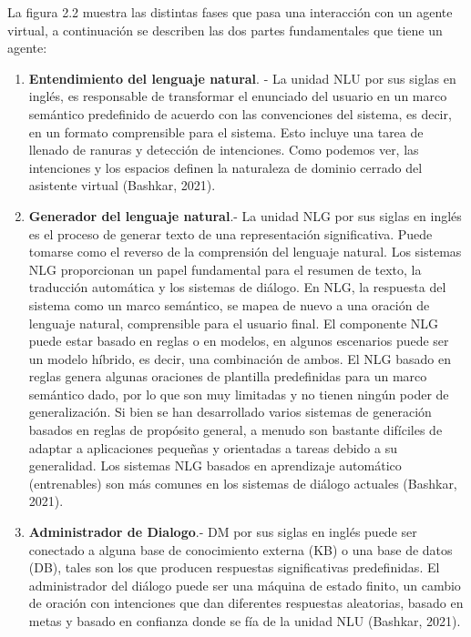 \documentclass[letter, openright, 12pt]{book}
\begin{document}
La figura 2.2 muestra las distintas fases que pasa una interacción con un agente virtual, a continuación se describen las dos partes fundamentales que tiene un agente: 

\newpage
\begin{enumerate}[label=(\alph*)]
\item \textbf{Entendimiento del lenguaje natural}. - La unidad NLU por sus siglas en inglés, es responsable de transformar el enunciado del usuario en un marco semántico predefinido de acuerdo con las convenciones del sistema, es decir, en un formato comprensible para el sistema. Esto incluye una tarea de llenado de ranuras y detección de intenciones. Como podemos ver, las intenciones y los espacios definen la naturaleza de dominio cerrado del asistente virtual (Bashkar, 2021).

\item \textbf{Generador del lenguaje natural}.- La unidad NLG por sus siglas en inglés es el proceso de generar texto de una representación significativa. Puede tomarse como el reverso de la comprensión del lenguaje natural. Los sistemas NLG proporcionan un papel fundamental para el resumen de texto, la traducción automática y los sistemas de diálogo. En NLG, la respuesta del sistema como un marco semántico, se mapea de nuevo a una oración de lenguaje natural, comprensible para el usuario final. El componente NLG puede estar basado en reglas o en modelos, en algunos escenarios puede ser un modelo híbrido, es decir, una combinación de ambos. El NLG basado en reglas genera algunas oraciones de plantilla predefinidas para un marco semántico dado, por lo que son muy limitadas y no tienen ningún poder de generalización. Si bien se han desarrollado varios sistemas de generación basados en reglas de propósito general, a menudo son bastante difíciles de adaptar a aplicaciones pequeñas y orientadas a tareas debido a su generalidad. Los sistemas NLG basados en aprendizaje automático (entrenables) son más comunes en los sistemas de diálogo actuales (Bashkar, 2021).

\item \textbf{Administrador de Dialogo}.- DM por sus siglas en inglés puede ser conectado a alguna base de conocimiento externa (KB) o una base de datos (DB), tales son los que producen respuestas significativas predefinidas. El administrador del diálogo puede ser una máquina de estado finito, un cambio de oración con intenciones que dan diferentes respuestas aleatorias, basado en metas y basado en confianza donde se fía de la unidad NLU (Bashkar, 2021).

\end{enumerate}
\end{document}
